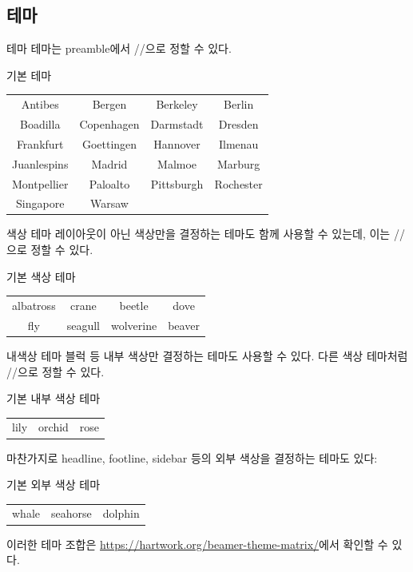\documentclass[compress]{beamer}
\begin{document}
\subsection{테마}
\begin{frame}{테마}
  테마는 preamble에서 \ltxverb/\usetheme{}/으로 정할 수 있다.
  \begin{exampleblock}{기본 테마}
    \begin{center}
      \begin{tabular}{cccc}
        Antibes & Bergen & Berkeley & Berlin \\
        Boadilla & Copenhagen & Darmstadt & Dresden \\
        Frankfurt & Goettingen & Hannover & Ilmenau \\
        Juanlespins & Madrid & Malmoe & Marburg \\
        Montpellier & Paloalto & Pittsburgh & Rochester \\
        Singapore & Warsaw &&
      \end{tabular}
    \end{center}
  \end{exampleblock}
\end{frame}

\begin{frame}{색상 테마}
  레이아웃이 아닌 색상만을 결정하는 테마도 함께 사용할 수 있는데, 이는
  \ltxverb/\usecolortheme{}/으로 정할 수 있다.
  \begin{exampleblock}{기본 색상 테마}
    \begin{center}
      \begin{tabular}{cccc}
        albatross & crane & beetle & dove \\
        fly & seagull & wolverine & beaver
      \end{tabular}
    \end{center}
  \end{exampleblock}
\end{frame}

\begin{frame}{내 색상 테마}
  블럭 등 내부 색상만 결정하는 테마도 사용할 수 있다.
  다른 색상 테마처럼 \ltxverb/\usecolortheme{}/으로 정할 수 있다.
  \begin{exampleblock}{기본 내부 색상 테마}
    \begin{tabular}{ccc}
      lily & orchid & rose
    \end{tabular}
  \end{exampleblock}

  마찬가지로 headline, footline, sidebar 등의 외부 색상을 결정하는 테마도 있다:
  \begin{exampleblock}{기본 외부 색상 테마}
    \begin{tabular}{ccc}
      whale & seahorse & dolphin
    \end{tabular}
  \end{exampleblock}

  이러한 테마 조합은 \url{https://hartwork.org/beamer-theme-matrix/}에서 확인할
  수 있다.
\end{frame}
\end{document}
